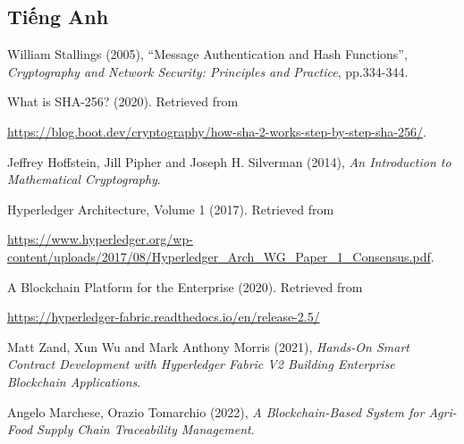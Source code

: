
\begin{thebibliography}{1}
    \subsection*{Tiếng Anh}
    \setlength{\bibindent}{1cm}
    \setlength{\itemindent}{-\bibindent}
  
    \raggedright
    William Stallings (2005),
    ``Message Authentication and Hash Functions'',
    \emph{Cryptography and Network Security: Principles and Practice}, 
    pp.334-344.

      What is SHA-256? (2020).
      Retrieved from

    \url{https://blog.boot.dev/cryptography/how-sha-2-works-step-by-step-sha-256/}.
  
        
    \raggedright
    Jeffrey Hoffstein, Jill Pipher and Joseph H. Silverman (2014),
    \emph{An Introduction to Mathematical Cryptography}.

    \raggedright
    Hyperledger  Architecture, Volume 1 (2017). Retrieved from

    \url{https://www.hyperledger.org/wp-content/uploads/2017/08/Hyperledger_Arch_WG_Paper_1_Consensus.pdf}.
  
    \raggedright
    A Blockchain Platform for the Enterprise (2020). Retrieved from

    \url{https://hyperledger-fabric.readthedocs.io/en/release-2.5/}

    \raggedright
    Matt Zand, Xun Wu and Mark Anthony Morris (2021),
    \emph{Hands-On Smart Contract Development with Hyperledger Fabric V2 Building Enterprise Blockchain Applications}.

    \raggedright
    Angelo Marchese, Orazio Tomarchio (2022),
    \emph{A Blockchain-Based System for Agri-Food Supply Chain Traceability Management}.


  \end{thebibliography}
